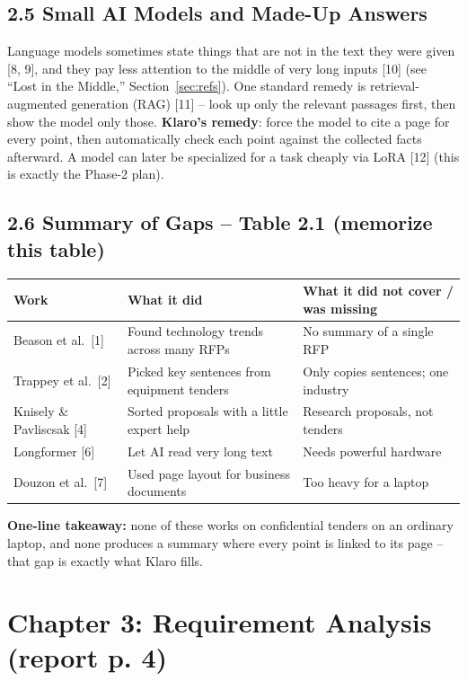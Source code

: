 \documentclass[11pt,a4paper]{article}
\begin{document}
\subsection*{2.5 Small AI Models and Made-Up Answers}
Language models sometimes state things that are not in the text they were given [8, 9], and they pay
less attention to the middle of very long inputs [10] (see ``Lost in the Middle,'' Section~\ref{sec:refs}).
One standard remedy is retrieval-augmented generation (RAG) [11] -- look up only the relevant
passages first, then show the model only those. \textbf{Klaro's remedy}: force the model to cite a
page for every point, then automatically check each point against the collected facts afterward. A
model can later be specialized for a task cheaply via LoRA [12] (this is exactly the Phase-2 plan).

\subsection*{2.6 Summary of Gaps -- Table 2.1 (memorize this table)}
\begin{center}
\small
\begin{tabular}{@{}p{2.6cm}p{4.3cm}p{4.3cm}@{}}
\toprule
\textbf{Work} & \textbf{What it did} & \textbf{What it did not cover / was missing}\\
\midrule
Beason et al.\ [1] & Found technology trends across many RFPs & No summary of a single RFP\\
Trappey et al.\ [2] & Picked key sentences from equipment tenders & Only copies sentences; one industry\\
Knisely \& Pavliscsak [4] & Sorted proposals with a little expert help & Research proposals, not tenders\\
Longformer [6] & Let AI read very long text & Needs powerful hardware\\
Douzon et al.\ [7] & Used page layout for business documents & Too heavy for a laptop\\
\bottomrule
\end{tabular}
\end{center}
\textbf{One-line takeaway:} none of these works on confidential tenders on an ordinary laptop, and
none produces a summary where every point is linked to its page -- that gap is exactly what Klaro
fills.

\newpage
\section{Chapter 3: Requirement Analysis (report p. 4)}
\end{document}
